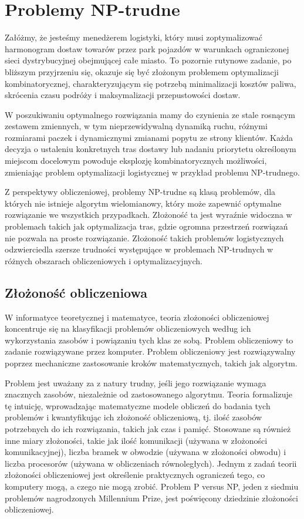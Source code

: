 \chapter{Problemy NP-trudne}

Załóżmy, że jesteśmy menedżerem logistyki, który musi zoptymalizować harmonogram dostaw towarów przez park pojazdów w warunkach ograniczonej sieci dystrybucyjnej obejmującej całe miasto. To pozornie rutynowe zadanie, po bliższym przyjrzeniu się, okazuje się być złożonym problemem optymalizacji kombinatorycznej, charakteryzującym się potrzebą minimalizacji kosztów paliwa, skrócenia czasu podróży i maksymalizacji przepustowości dostaw.

W poszukiwaniu optymalnego rozwiązania mamy do czynienia ze stale rosnącym zestawem zmiennych, w tym nieprzewidywalną dynamiką ruchu, różnymi rozmiarami paczek i dynamicznymi zmianami popytu ze strony klientów. Każda decyzja o ustaleniu konkretnych tras dostawy lub nadaniu priorytetu określonym miejscom docelowym powoduje eksplozję kombinatorycznych możliwości, zmieniając problem optymalizacji logistycznej w przykład problemu NP-trudnego.

Z perspektywy obliczeniowej, problemy NP-trudne są klasą problemów, dla których nie istnieje algorytm wielomianowy, który może zapewnić optymalne rozwiązanie we wszystkich przypadkach. Złożoność ta jest wyraźnie widoczna w problemach takich jak optymalizacja tras, gdzie ogromna przestrzeń rozwiązań nie pozwala na proste rozwiązanie. Złożoność takich problemów logistycznych odzwierciedla szersze trudności występujące w problemach NP-trudnych w różnych obszarach obliczeniowych i optymalizacyjnych.

\section{Złożoność obliczeniowa}

W informatyce teoretycznej i matematyce, teoria złożoności obliczeniowej koncentruje się na klasyfikacji problemów obliczeniowych według ich wykorzystania zasobów i powiązaniu tych klas ze sobą. Problem obliczeniowy to zadanie rozwiązywane przez komputer. Problem obliczeniowy jest rozwiązywalny poprzez mechaniczne zastosowanie kroków matematycznych, takich jak algorytm.

Problem jest uważany za z natury trudny, jeśli jego rozwiązanie wymaga znacznych zasobów, niezależnie od zastosowanego algorytmu. Teoria formalizuje tę intuicję, wprowadzając matematyczne modele obliczeń do badania tych problemów i kwantyfikując ich złożoność obliczeniową, tj. ilość zasobów potrzebnych do ich rozwiązania, takich jak czas i pamięć. Stosowane są również inne miary złożoności, takie jak ilość komunikacji (używana w złożoności komunikacyjnej), liczba bramek w obwodzie (używana w złożoności obwodu) i liczba procesorów (używana w obliczeniach równoległych). Jednym z zadań teorii złożoności obliczeniowej jest określenie praktycznych ograniczeń tego, co komputery mogą, a czego nie mogą zrobić. Problem P versus NP, jeden z siedmiu problemów nagrodzonych Millennium Prize, jest poświęcony dziedzinie złożoności obliczeniowej.


